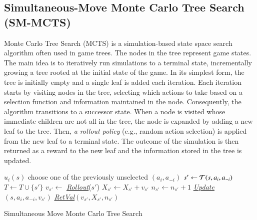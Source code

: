 \subsection{Simultaneous-Move Monte Carlo Tree Search (SM-MCTS)}
Monte Carlo Tree Search (MCTS) is a simulation-based state space search algorithm often used
in game trees. The nodes in the tree represent game states. The main idea is to iteratively run
simulations to a terminal state, incrementally growing a tree rooted at the initial state of the game. In
its simplest form, the tree is initially empty and a single leaf is added each iteration. Each iteration
starts by visiting nodes in the tree, selecting which actions to take based on a selection function and
information maintained in the node. Consequently, the algorithm transitions to a successor state. When a
node is visited whose immediate children are not all in the tree, the node is expanded by adding a
new leaf to the tree. Then, \emph{a rollout policy} (e.g., random action selection) is applied from the new
leaf to a terminal state. The outcome of the simulation is then returned as a reward to the new leaf
and the information stored in the tree is updated.

\begin{algorithm2e}[t]
\small
{}
 {
	\Return $u_i(s)$
}
 {
	choose one of the previously unselected $(a_i, a_{-i})$\;
	$s' \leftarrow \mathcal{T}(s,a_i,a_{-i})$\;
	$T \leftarrow T \cup \lbrace s' \rbrace$\;
	$v_{s'} \leftarrow $ \emph{\underline{Rollout}}($s'$)\;
	$X_{s'} \leftarrow X_{s'} + v_{s'}$\;
	$n_{s'} \leftarrow n_{s'} + 1$\;
	\emph{\underline{Update}}$(s,a_i,a_{-i},v_{s'})$\;\label{alg:smmcts:up1}
	\Return \emph{\underline{RetVal}}$(v_{s'}, X_{s'}, n_{s'})$ 	
}
\caption{Simultaneous Move Monte Carlo Tree Search}\label{alg:smmmcts}
\end{algorithm2e}

